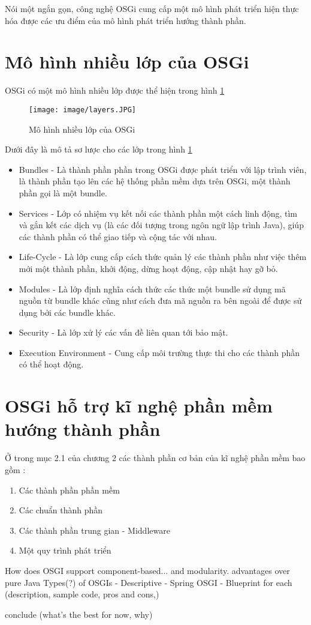 Nói một ngắn gọn, công nghệ OSGi cung cấp một mô hình phát triển hiện thực hóa được các ưu điểm của mô hình phát triển hướng thành phần.

\section{Mô hình nhiều lớp của OSGi}

OSGi có một mô hình nhiều lớp \cite{whatisosgi} được thể hiện trong hình \ref{fig:layers}
\begin{figure}[htbp]
	\centering
		\texttt{[image: image/layers.JPG]}
	\caption{Mô hình nhiều lớp của OSGi}
	\label{fig:layers}
\end{figure}


Dưới đây là mô tả sơ lược cho các lớp trong hình \ref{fig:layers}
\begin{itemize}
	\item Bundles - Là thành phần phần trong OSGi được phát triển với lập trình viên, là thành phần tạo lên các hệ thống phần mềm dựa trên OSGi, một thành phần gọi là một bundle.
	\item Services - Lớp có nhiệm vụ kết nối các thành phần một cách linh động, tìm và gắn kết các dịch vụ (là các đối tượng trong ngôn ngữ lập trình Java),  giúp các thành phần có thể giao tiếp và cộng tác với nhau.
	\item Life-Cycle - Là lớp cung cấp cách thức quản lý các thành phần như việc thêm mới một thành phần, khởi động, dừng hoạt động, cập nhật hay gỡ bỏ.
	\item Modules - Là lớp định nghĩa cách thức các thức một bundle sử dụng mã nguồn từ bundle khác cũng như cách đưa mã nguồn ra bên ngoài để được sử dụng bởi các bundle khác. 	
	\item  Security - Là lớp xử lý các vấn đề liên quan tới bảo mật.
	\item  Execution Environment - Cung cấp môi trường thực thi cho các thành phần có thể hoạt động.
\end{itemize}

\section{OSGi hỗ trợ kĩ nghệ phần mềm hướng thành phần}
Ở trong mục 2.1 của chương 2 các thành phần cơ bản của kĩ nghệ phần mềm bao gồm :
\begin{enumerate}
	\item Các thành phần phần mềm
	\item Các chuẩn thành phần
	\item Các thành phần trung gian - Middleware
	\item Một quy trình phát triển
\end{enumerate}

 How does OSGI support component-based... and modularity.
advantages over pure Java
 Types(?) of OSGIs
- Descriptive
- Spring OSGI
- Blueprint
for each (description, sample code, pros and cons,)

conclude (what's the best for now, why)
